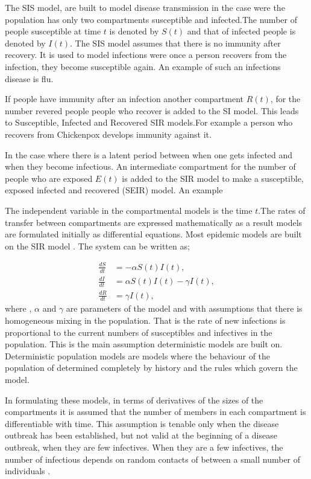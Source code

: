 The SIS model, are built to model disease transmission in the case were the population has only two compartments susceptible and infected.The number of people susceptible  at time $t$ is denoted by $S(t)$ and that of infected people is denoted by $I(t)$. The SIS model assumes that there is no immunity after recovery. It is used to model infections were once a person recovers from the infection, they become susceptible again. An example of such an infections disease is flu.

If people have immunity after an infection another compartment $R(t)$, for the number revered people people who recover is added to the SI model. This leads to Susceptible, Infected and Recovered SIR models.For example a person who recovers from Chickenpox develops immunity against it. 

In the case where there is a latent period between when one gets infected and when they become infectious. An intermediate compartment for the number of people who are exposed $E(t)$ is added to the SIR model to make a susceptible, exposed infected and recovered (SEIR) model. An example 

The independent variable in the compartmental models is the time $t$.The rates of transfer between compartments are expressed mathematically as a result models are formulated initially as differential equations. Most epidemic models are built on the SIR model \citep{m1925applications}. The system can be written as;

\begin{align}\label{eqn1_1}
\frac{dS}{dt} &= -\alpha S(t) I(t), \nonumber  \\
\frac{dI}{dt} &= \alpha S(t) I(t) - \gamma  I(t), \\
\frac{dR}{dt} &= \gamma  I(t), \nonumber  
\end{align}
where , $\alpha$ and $\gamma$ are parameters of the model and with assumptions that there is homogeneous mixing in the population. That is the rate of new infections is proportional to the current numbers of susceptibles and infectives in the population. This is the main assumption deterministic models are built on. Deterministic population  models are models where the behaviour of the population of determined completely by history and the rules which govern the model. 

In formulating these models, in terms of derivatives of the sizes of the compartments it is assumed that the number of members in each compartment is differentiable with time. This assumption is tenable only when the disease outbreak has been established, but not valid at the beginning of a disease outbreak, when they are few infectives. When they are a few infectives, the number of infectious depends on random contacts of between a small number of individuals \citep{brauer2012mathematical}.
 
